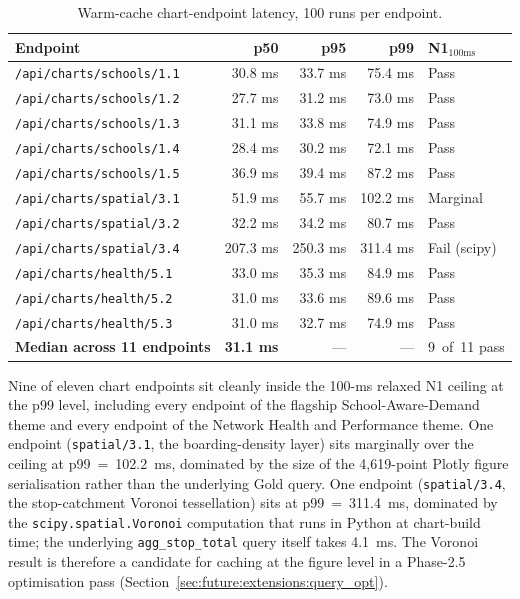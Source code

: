 \begin{table}[!htbp]
\centering
\caption{Warm-cache chart-endpoint latency, 100 runs per endpoint.}
\label{tab:arch:endpoints}
\footnotesize
\renewcommand{\arraystretch}{1.20}
\begin{tabularx}{\linewidth}{p{4.8cm} r r r X}
\hline
\textbf{Endpoint} & \textbf{p50} & \textbf{p95} & \textbf{p99} & \textbf{N1$_{100\text{ms}}$} \\
\hline
\texttt{/api/charts/schools/1.1}    &  30.8 ms &  33.7 ms &  75.4 ms & Pass \\
\texttt{/api/charts/schools/1.2}    &  27.7 ms &  31.2 ms &  73.0 ms & Pass \\
\texttt{/api/charts/schools/1.3}    &  31.1 ms &  33.8 ms &  74.9 ms & Pass \\
\texttt{/api/charts/schools/1.4}    &  28.4 ms &  30.2 ms &  72.1 ms & Pass \\
\texttt{/api/charts/schools/1.5}    &  36.9 ms &  39.4 ms &  87.2 ms & Pass \\
\texttt{/api/charts/spatial/3.1}    &  51.9 ms &  55.7 ms & 102.2 ms & Marginal \\
\texttt{/api/charts/spatial/3.2}    &  32.2 ms &  34.2 ms &  80.7 ms & Pass \\
\texttt{/api/charts/spatial/3.4}    & 207.3 ms & 250.3 ms & 311.4 ms & Fail (scipy) \\
\texttt{/api/charts/health/5.1}     &  33.0 ms &  35.3 ms &  84.9 ms & Pass \\
\texttt{/api/charts/health/5.2}     &  31.0 ms &  33.6 ms &  89.6 ms & Pass \\
\texttt{/api/charts/health/5.3}     &  31.0 ms &  32.7 ms &  74.9 ms & Pass \\
\hline
\textbf{Median across 11 endpoints} &  \textbf{31.1 ms} & --- & --- & 9~of~11 pass \\
\hline
\end{tabularx}
\end{table}

Nine of eleven chart endpoints sit cleanly inside the 100-ms
relaxed N1 ceiling at the p99 level, including every endpoint of the
flagship School-Aware-Demand theme and every endpoint of the Network
Health and Performance theme. One endpoint (\texttt{spatial/3.1},
the boarding-density layer) sits marginally over the ceiling at
p99~=~102.2~ms, dominated by the size of the 4{,}619-point Plotly
figure serialisation rather than the underlying Gold query. One
endpoint (\texttt{spatial/3.4}, the stop-catchment Voronoi
tessellation) sits at p99~=~311.4~ms, dominated by the
\texttt{scipy.spatial.Voronoi} computation that runs in Python at
chart-build time; the underlying \texttt{agg\_stop\_total} query
itself takes 4.1~ms. The Voronoi result is therefore a candidate
for caching at the figure level in a Phase-2.5 optimisation pass
(Section~\ref{sec:future:extensions:query_opt}).

